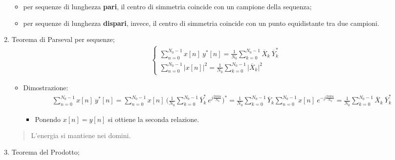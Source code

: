 \documentclass[
]{article}
\providecommand{\tightlist}{%
  \setlength{\itemsep}{0pt}\setlength{\parskip}{0pt}}
\begin{document}
\begin{enumerate}
  \begin{itemize}
  \tightlist
  \item
    per sequenze di lunghezza \textbf{pari}, il centro di simmetria
    coincide con un campione della sequenza;
  \item
    per sequenze di lunghezza \textbf{dispari}, invece, il centro di
    simmetria coincide con un punto equidistante tra due campioni.
  \end{itemize}
\item
  Teorema di Parseval per sequenze; \begin{gather*}
  \left\{ \begin{array}{cl} \displaystyle
  \sum_{n=0}^{N_0 -1} x[n] \ y^{*}[n] = \frac{1}{N_0} \sum_{k=0}^{N_0 -1}\overline{X}_k \ \overline{Y}^{*}_{k} \\
  \displaystyle\sum_{n=0}^{N_0 -1} \Big|x[n]\Big|^{2} = \frac{1}{N_0} \sum_{k=0}^{N_0 -1} \Big|\overline{X}_{k}\Big|^{2}
  \end{array} \right.
  \end{gather*}

  \begin{itemize}
  \tightlist
  \item
    Dimostrazione: \begin{gather*}
    \sum_{n=0}^{N_0 -1} x[n] \ y^{*}[n] =\sum_{n=0}^{N_0 -1}x[n] \ \Big(\frac{1}{N_0}\sum_{k=0}^{N_0 - 1}\overline{Y}_k^{*} \ e^{j\frac{2\pi kn}{N_0}}\Big)^{*} 
    = \frac{1}{N_0} \sum_{k=0}^{N_0 -1} \overline{Y}_k \sum_{n=0}^{N_0 -1 }x[n] \ e^{-j\frac{2\pi kn}{N_0}} = \frac{1}{N_0} \sum_{k=0}^{N_0 -1} \overline{X}_k \ \overline{Y}^{*}_k
    \end{gather*}

    \begin{itemize}
    \tightlist
    \item
      Ponendo \(x[n]=y[n]\) si ottiene la seconda relazione.
    \end{itemize}
  \end{itemize}

  \begin{quote}
  L'energia si mantiene nei domini.
  \end{quote}
\item
  Teorema del Prodotto;


\end{enumerate}
\end{document}
